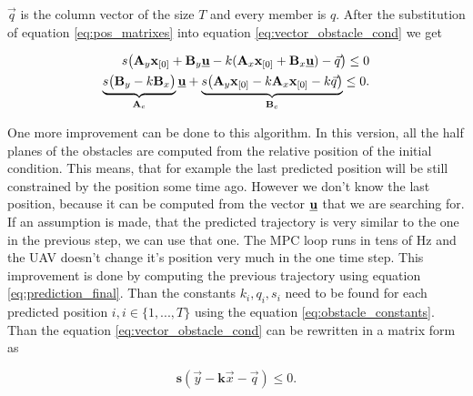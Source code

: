 \documentclass{article}
\begin{document}
$\vec{q}$ is the column vector of the size $T$ and every member is $q$.
 After the substitution of equation \ref{eq:pos_matrixes} into equation \ref{eq:vector_obstacle_cond} we get
 
\begin{equation}
\begin{split}
s\big(\textbf{A}_y \textbf{x}_{[0]} + \textbf{B}_y \textbf{\underline{u}} - k(\textbf{A}_x \textbf{x}_{[0]} + \textbf{B}_x \textbf{\underline{u}}) - \vec{q}\big) \leq 0 \\
\underbrace{s\big(\textbf{B}_y-k\textbf{B}_x\big)}_{\textbf{A}_c} \textbf{\underline{u}} +
\underbrace{s\big(\textbf{A}_y \textbf{x}_{[0]} - k\textbf{A}_x \textbf{x}_{[0]} -k\vec{q}\big)}_{\textbf{B}_c} \leq 0.
\end{split}
\end{equation}

One more improvement can be done to this algorithm. In this version, all the half planes of the obstacles are computed from the relative position of the initial condition. This means, that for example the last predicted position will be still constrained by the position some time ago. However we don't know the last position, because it can be computed from the vector $\textbf{\underline{u}}$ that we are searching for. If an assumption is made, that the predicted trajectory is very similar to the one in the previous step, we can use that one. The MPC loop runs in tens of Hz and the UAV doesn't change it's position very much in the one time step. This improvement is done by computing the previous trajectory using equation \ref{eq:prediction_final}. Than the constants $k_{i}, q_{i}, s_{i}$ need to be found for each predicted position $i, i\in\{1,...,T\}$ using the equation \ref{eq:obstacle_constants}. Than the equation \ref{eq:vector_obstacle_cond} can be rewritten in a matrix form as

\begin{equation}
\label{eq:matrix_obstacle_cond}
\textbf{s}(\vec{y} - \textbf{k}\vec{x} - \vec{q}) \leq 0.
\end{equation}
\end{document}
